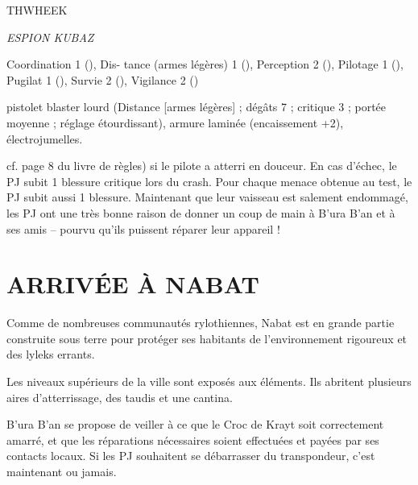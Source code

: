 \documentclass[a4paper,10pt,twoside,twocolumn,openany]{book}
\begin{document}
\begin{monsterbox}{THWHEEK}
  \begin{hangingpar}
    \textit{ESPION KUBAZ}
  \end{hangingpar}
  \hline%

  \stats[VIG=2,AGI=3,INT=3,RUS=4,VOL=2,PRE=2]
  \hline%

  \basics[encaissement=4,blessure=12]

  \hline%

\begin{monsteraction}[Compétences]
 Coordination 1 (\ability \ability \proficiency), Dis-
tance (armes légères) 1 (\ability \ability \proficiency), Perception 2
(\ability \ability \proficiency \proficiency), Pilotage 1 (\ability \ability \proficiency), Pugilat 1 (\ability \proficiency),
Survie 2 (\ability \ability \proficiency \proficiency), Vigilance 2 (\proficiency \proficiency)
\end{monsteraction}

  \begin{monsteraction}[Équipement]
    pistolet blaster lourd (Distance [armes légères] ; dégâts 7 ; critique 3 ; portée
moyenne ; réglage étourdissant), armure laminée
(encaissement +2), électrojumelles.
  \end{monsteraction}

\end{monsterbox}


cf. page 8 du livre de règles) si le pilote a atterri en douceur. En cas d’échec, le PJ subit 1 blessure critique lors
du crash. Pour chaque menace \threat obtenue au test, le PJ
subit aussi 1 blessure.
Maintenant que leur vaisseau est salement endommagé, les PJ ont une très bonne raison de donner un
coup de main à B’ura B’an et à ses amis – pourvu qu’ils
puissent réparer leur appareil !

\section{ARRIVÉE À NABAT}
Comme de nombreuses communautés rylothiennes,
Nabat est en grande partie construite sous terre pour
protéger ses habitants de l’environnement rigoureux et
des lyleks errants.

Les niveaux supérieurs de la ville sont exposés aux
éléments. Ils abritent plusieurs aires d’atterrissage, des
taudis et une cantina.

B’ura B’an se propose de veiller à ce que le Croc de
Krayt soit correctement amarré, et que les réparations
nécessaires soient effectuées et payées par ses contacts
locaux. Si les PJ souhaitent se débarrasser du transpondeur, c’est maintenant ou jamais.
\end{document}
